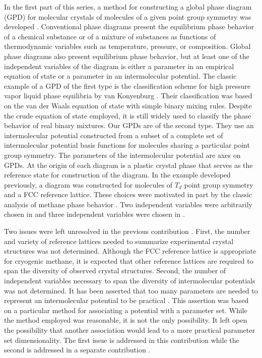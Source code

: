 \documentclass[preprint]{iucr}              %
\begin{document}
In the first part of this series, a method for constructing a global phase diagram (GPD) for molecular crystals of molecules of a given point group symmetry was developed \cite{Mettes04}.  Conventional phase diagrams present the equilibrium phase behavior of a chemical substance or of a mixture of substances as functions of thermodynamic variables such as temperature, pressure, or composition.  Global phase diagrams also present equilibrium phase behavior, but at least one of the independent variables of the diagram is either a parameter in an empirical equation of state or a parameter in an intermolecular potential.  The classic example of a GPD of the first type is the classification scheme for high pressure vapor liquid phase equilibria by van Konyenburg \cite{VanKonyenburg80}. Their classification was based on the van der Waals equation of state with simple binary mixing rules. Despite the crude equation of state employed, it is still widely used to classify the phase behavior of real binary mixtures.  Our GPDs are of the second type. They use an intermolecular potential constructed from a subset of a complete set of intermolecular potential basis functions for molecules sharing a particular point group symmetry.  The parameters of the intermolecular potential are axes on GPDs.  At the origin of each diagram is a plastic crystal phase that serves as the reference state for construction of the diagram.  In the example developed previously, \cite{Keith04c,Mettes04} a diagram was constructed for molecules of $T_d$ point group symmetry and a FCC reference lattice.  These choices were motivated in part by the classic analysis of methane phase behavior \cite{James59}.  Two independent variables were arbitrarily chosen in \cite{Keith04c} and three independent variables were chosen in \cite{Mettes04}.  

Two issues were left unresolved in the previous contribution \cite{Mettes04}.  First, the number and variety of reference lattices needed to summarize experimental crystal structures was not determined.  Although the FCC reference lattice is appropriate for cryogenic methane, it is expected that other reference lattices are required to span the diversity of observed crystal structures.  Second, the number of independent variables necessary to span the diversity of intermolecular potentials was not determined.  It has been asserted that too many parameters are needed to represent an intermolecular potential to be practical \cite{Briels80}.  This assertion was based on a particular method for associating a potential with a parameter set.  While the method employed was reasonable, it is not the only possibility.  It left open the possibility that another association would lead to a more practical parameter set dimensionality.  The first issue is addressed in this contribution while the second is addressed in a separate contribution \cite{Keith09}.
\end{document}
